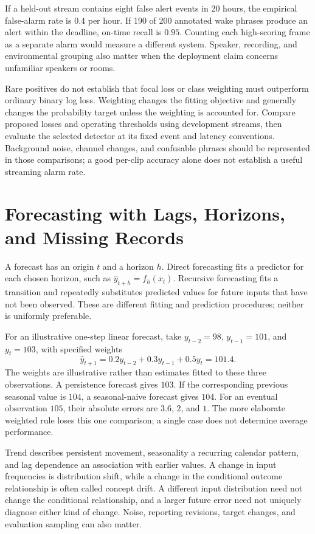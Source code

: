 If a held-out stream contains eight false alert events in 20 hours, the empirical false-alarm rate is $0.4$ per hour. If 190 of 200 annotated wake phrases produce an alert within the deadline, on-time recall is $0.95$. Counting each high-scoring frame as a separate alarm would measure a different system. Speaker, recording, and environmental grouping also matter when the deployment claim concerns unfamiliar speakers or rooms.

Rare positives do not establish that focal loss or class weighting must outperform ordinary binary log loss. Weighting changes the fitting objective and generally changes the probability target unless the weighting is accounted for. Compare proposed losses and operating thresholds using development streams, then evaluate the selected detector at its fixed event and latency conventions. Background noise, channel changes, and confusable phrases should be represented in those comparisons; a good per-clip accuracy alone does not establish a useful streaming alarm rate.

\section{Forecasting with Lags, Horizons, and Missing Records}

A forecast has an origin $t$ and a horizon $h$. Direct forecasting fits a predictor for each chosen horizon, such as $\hat y_{t+h}=f_h(x_t)$. Recursive forecasting fits a transition and repeatedly substitutes predicted values for future inputs that have not been observed. These are different fitting and prediction procedures; neither is uniformly preferable.

For an illustrative one-step linear forecast, take $y_{t-2}=98$, $y_{t-1}=101$, and $y_t=103$, with specified weights
\[
 \hat y_{t+1}=0.2y_{t-2}+0.3y_{t-1}+0.5y_t=101.4.
\]
The weights are illustrative rather than estimates fitted to these three observations. A persistence forecast gives $103$. If the corresponding previous seasonal value is $104$, a seasonal-naive forecast gives $104$. For an eventual observation $105$, their absolute errors are $3.6$, $2$, and $1$. The more elaborate weighted rule loses this one comparison; a single case does not determine average performance.

Trend describes persistent movement, seasonality a recurring calendar pattern, and lag dependence an association with earlier values. A change in input frequencies is distribution shift, while a change in the conditional outcome relationship is often called concept drift. A different input distribution need not change the conditional relationship, and a larger future error need not uniquely diagnose either kind of change. Noise, reporting revisions, target changes, and evaluation sampling can also matter.

